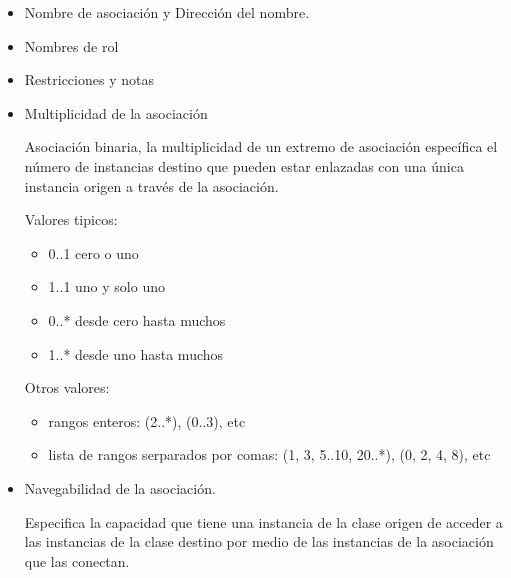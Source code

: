 \documentclass[12pt, twoside, openright]{report} %
\begin{document}
\begin{itemize}
	\item Nombre de asociación y Dirección del nombre.
	      \begin{figure}[H]
		      {\def\svgwidth{.8\textwidth}
			      }
	      \end{figure}
	\item Nombres de rol
	      \begin{figure}[H]
		      {\def\svgwidth{.7\textwidth}
			      }
	      \end{figure}
	\item Restricciones y notas
	\item Multiplicidad de la asociación

	      Asociación binaria, la multiplicidad de un extremo de asociación
	      específica el número de instancias destino que pueden estar
	      enlazadas con una única instancia origen a través de la
	      asociación.
	      \begin{figure}[H]
		      {\def\svgwidth{.9\textwidth}
			      }
	      \end{figure}

	      Valores tipicos:
	      \begin{itemize}
		      \item 0..1 cero o uno
		      \item 1..1 uno y solo uno
		      \item 0..* desde cero hasta muchos
		      \item 1..* desde uno hasta muchos
	      \end{itemize}
	      \pagebreak

	      Otros valores:
	      \begin{itemize}
		      \item rangos enteros: (2..*), (0..3), etc
		      \item lista de rangos serparados por comas: (1, 3, 5..10, 20..*), (0, 2, 4, 8), etc
	      \end{itemize}
	\item Navegabilidad de la asociación.

	      Especifica la capacidad que tiene una instancia de la clase origen
	      de acceder a las instancias de la clase destino por medio de las
	      instancias de la asociación que las conectan.


\end{itemize}
\end{document}
